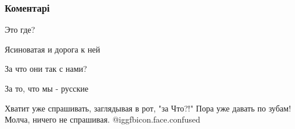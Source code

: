  
 
 
 
 
\subsubsection{Коментарі}

\begin{itemize} %
Это где?

Ясиноватая и дорога к ней

За что они так с нами?

За то, что мы - русские

Хватит уже спрашивать, заглядывая в рот, "за Что?!" 
Пора уже давать по зубам! Молча, ничего не спрашивая.  @igg{fbicon.face.confused} 

\end{itemize} %
